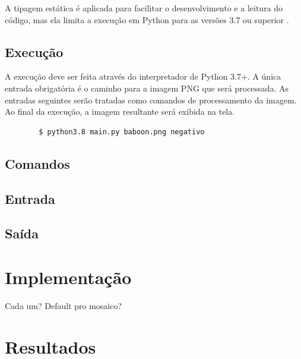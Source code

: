\documentclass[assignment = 0]{homework}
\begin{document}
    A tipagem estática é aplicada para facilitar o desenvolvimento e a leitura do código, mas ela limita a execução em Python para as versões 3.7 ou superior \autocite{ref:pep563}.

    \subsection{Execução}

    A execução deve ser feita através do interpretador de Python 3.7+. A única entrada obrigatória é o caminho para a imagem PNG que será processada. As entradas seguintes serão tratadas como comandos de processamento da imagem. Ao final da execução, a imagem resultante será exibida na tela.

    \begin{verbatim}
        $ python3.8 main.py baboon.png negativo
    \end{verbatim}

    \subsection{Comandos}
    \subsection{Entrada}
    \subsection{Saída}

    \section{Implementação}
    Cada um? Default pro mosaico?

    \section{Resultados}
\end{document}
